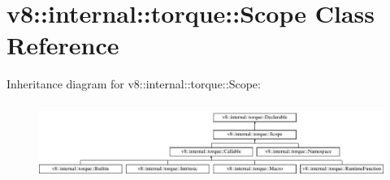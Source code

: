 \hypertarget{classv8_1_1internal_1_1torque_1_1Scope}{}\section{v8\+:\+:internal\+:\+:torque\+:\+:Scope Class Reference}
\label{classv8_1_1internal_1_1torque_1_1Scope}
Inheritance diagram for v8\+:\+:internal\+:\+:torque\+:\+:Scope\+:\begin{figure}[H]
\begin{center}
\leavevmode
\includegraphics[height=2.522522cm]{classv8_1_1internal_1_1torque_1_1Scope}
\end{center}
\end{figure}
